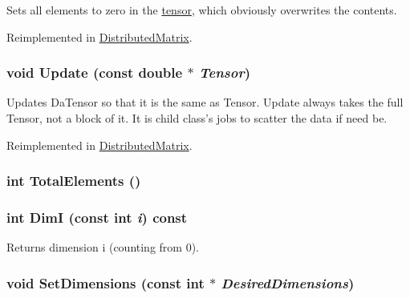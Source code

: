 Sets all elements to zero in the \hyperlink{classJKBuilder_1_1tensor}{tensor}, which obviously overwrites the contents. 

Reimplemented in \hyperlink{classJKBuilder_1_1DistributedMatrix_a98b1050f09da390896f964fb7a892391}{DistributedMatrix}.\hypertarget{classJKBuilder_1_1tensor_a10ffea2bf428adfa3e8319646c44a3c6}{
\subsubsection[{Update}]{\setlength{\rightskip}{0pt plus 5cm}void Update (const double $\ast$ {\em Tensor})}}
\label{classJKBuilder_1_1tensor_a10ffea2bf428adfa3e8319646c44a3c6}


Updates DaTensor so that it is the same as Tensor. Update always takes the full Tensor, not a block of it. It is child class's jobs to scatter the data if need be. 

Reimplemented in \hyperlink{classJKBuilder_1_1DistributedMatrix_a6a378face23ba83b2431cb08e8519066}{DistributedMatrix}.\hypertarget{classJKBuilder_1_1tensor_a537b2f14296e2f0e62f00e1703c5fa08}{
\subsubsection[{TotalElements}]{\setlength{\rightskip}{0pt plus 5cm}int TotalElements ()}}
\label{classJKBuilder_1_1tensor_a537b2f14296e2f0e62f00e1703c5fa08}
\hypertarget{classJKBuilder_1_1tensor_a6bdcfca6493bc217b607317dbceb28b2}{
\subsubsection[{DimI}]{\setlength{\rightskip}{0pt plus 5cm}int DimI (const int {\em i}) const}}
\label{classJKBuilder_1_1tensor_a6bdcfca6493bc217b607317dbceb28b2}


Returns dimension i (counting from 0). \hypertarget{classJKBuilder_1_1tensor_ace6bcf62c74395ab9e37abc4935f66e0}{
\subsubsection[{SetDimensions}]{\setlength{\rightskip}{0pt plus 5cm}void SetDimensions (const int $\ast$ {\em DesiredDimensions})}}
\label{classJKBuilder_1_1tensor_ace6bcf62c74395ab9e37abc4935f66e0}


